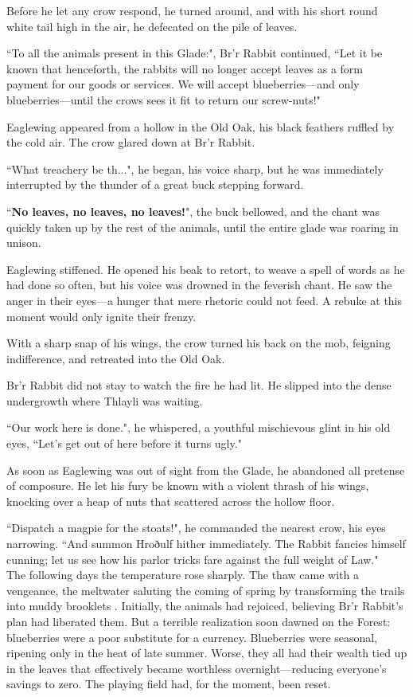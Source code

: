 Before he let any crow respond, he turned around, and with his short round white tail high in the air, he defecated on the pile of leaves.

``To all the animals present in this Glade:", Br'r Rabbit continued, ``Let it be known that henceforth, the rabbits will no longer accept leaves as a form payment for our goods or services. We will accept blueberries---and only blueberries---until the crows sees it fit to return our screw-nuts!"

Eaglewing appeared from a hollow in the Old Oak, his black feathers ruffled by the cold air. The crow glared down at Br'r Rabbit.

``What treachery be th...", he began, his voice sharp, but he was immediately interrupted by the thunder of a great buck stepping forward.

``\textbf{No leaves, no leaves, no leaves!}", the buck bellowed, and the chant was quickly taken up by the rest of the animals, until the entire glade was roaring in unison.

Eaglewing stiffened. He opened his beak to retort, to weave a spell of words as he had done so often, but his voice was drowned in the feverish chant. He saw the anger in their eyes---a hunger that mere rhetoric could not feed. A rebuke at this moment would only ignite their frenzy.

With a sharp snap of his wings, the crow turned his back on the mob, feigning indifference, and retreated into the Old Oak.

Br'r Rabbit did not stay to watch the fire he had lit. He slipped into the dense undergrowth where Thlayli was waiting.

``Our work here is done.", he whispered, a youthful mischievous glint in his old eyes, ``Let's get out of here before it turns ugly."

As soon as Eaglewing was out of sight from the Glade, he abandoned all pretense of composure. He let his fury be known with a violent thrash of his wings, knocking over a heap of nuts that scattered across the hollow floor.

``Dispatch a magpie for the stoats!", he commanded the nearest crow, his eyes narrowing. ``And summon Hroðulf hither immediately. The Rabbit fancies himself cunning; let us see how his parlor tricks fare against the full weight of Law."\\

The following days the temperature rose sharply. The thaw came with a vengeance, the meltwater saluting the coming of spring by transforming the trails into muddy brooklets
.
Initially, the animals had rejoiced, believing Br'r Rabbit's plan had liberated them. But a terrible realization soon dawned on the Forest: blueberries were a poor substitute for a currency. Blueberries were seasonal, ripening only in the heat of late summer. Worse, they all had their wealth tied up in the leaves that effectively became worthless overnight---reducing everyone's savings to zero. The playing field had, for the moment, been reset.

